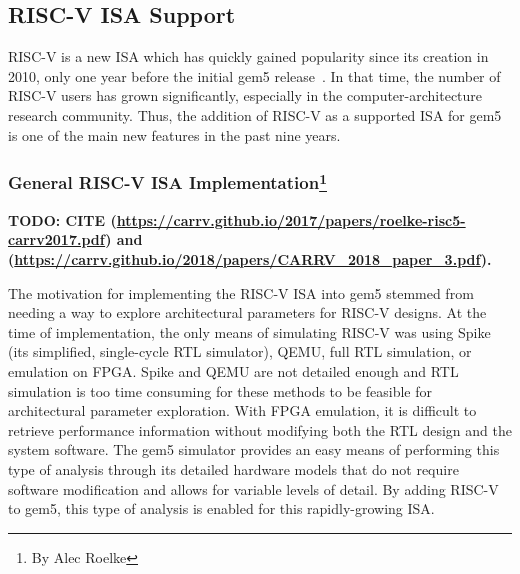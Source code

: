 \subsection[RISC-V ISA Support]{RISC-V ISA Support}

RISC-V is a new ISA which has quickly gained popularity since its creation in 2010, only one year before the initial gem5 release~\cite{Waterman2011riscv}.
In that time, the number of RISC-V users has grown significantly, especially in the computer-architecture research community.
Thus, the addition of RISC-V as a supported ISA for gem5 is one of the main new features in the past nine years.

\subsubsection[General RISC-V ISA Implementation]{General RISC-V ISA Implementation\footnote{By Alec Roelke}}

\textbf{TODO: CITE (\url{https://carrv.github.io/2017/papers/roelke-risc5-carrv2017.pdf}) and (\url{https://carrv.github.io/2018/papers/CARRV_2018_paper_3.pdf}).}

The motivation for implementing the RISC-V ISA into gem5 stemmed from needing a way to explore architectural parameters for RISC-V designs.
At the time of implementation, the only means of simulating RISC-V was using Spike (its simplified, single-cycle RTL simulator), QEMU, full RTL simulation, or emulation on FPGA.
Spike and QEMU are not detailed enough and RTL simulation is too time consuming for these methods to be feasible for architectural parameter exploration. With FPGA emulation, it is difficult to retrieve performance information without modifying both the RTL design and the system software.
The gem5 simulator provides an easy means of performing this type of analysis through its detailed hardware models that do not require software modification and allows for variable levels of detail.
By adding RISC-V to gem5, this type of analysis is enabled for this rapidly-growing ISA.

